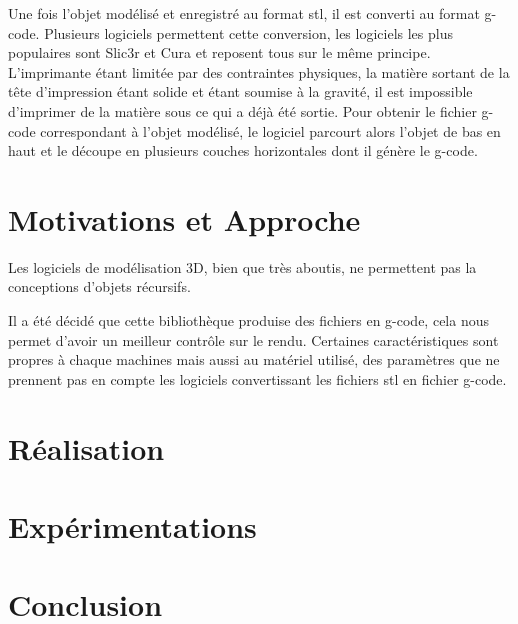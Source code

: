 \documentclass[a4paper,11pt]{article}
\begin{document}
Une fois l'objet modélisé et enregistré au format stl, il est converti au format g-code.
Plusieurs logiciels permettent cette conversion, les logiciels les plus populaires sont Slic3r et Cura et reposent tous sur le même principe.
L'imprimante étant limitée par des contraintes physiques, la matière sortant de la tête d'impression étant solide et étant soumise à la gravité, il est impossible d'imprimer de la matière sous ce qui a déjà été sortie.
Pour obtenir le fichier g-code correspondant à l'objet modélisé, le logiciel parcourt alors l'objet de bas en haut et le découpe en plusieurs couches horizontales dont il génère le g-code.

\newpage
\section{Motivations et Approche}
Les logiciels de modélisation 3D, bien que très aboutis, ne permettent pas la conceptions d’objets récursifs. 

Il a été décidé que cette bibliothèque produise des fichiers en g-code, cela nous permet d'avoir un meilleur contrôle sur le rendu. Certaines caractéristiques sont propres à chaque machines mais aussi au matériel utilisé, des paramètres que ne prennent pas en compte les logiciels convertissant les fichiers stl en fichier g-code.
\newpage
\section{Réalisation}
\newpage
\section{Expérimentations}
\newpage
\section{Conclusion}
\end{document}
